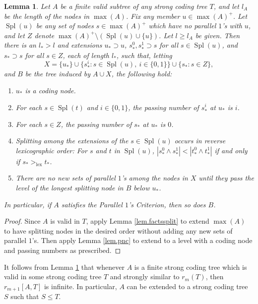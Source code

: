 \documentclass{amsart}
\newtheorem{lem}[thm]{Lemma}
\theoremstyle{remark}
\theoremstyle{definition}
\theoremstyle{remark}
\DeclareMathOperator{\Spl}{Spl}
\newcommand{\POC}{Parallel $1$'s Criterion}
\begin{document}
\begin{lem}\label{lem.facts}
Let $A$ be a finite  valid subtree of any strong coding tree  $T$, and let $l_A$ be the length of the nodes in $\max(A)$.
Fix any member $u\in\max(A)^+$.
Let $\Spl(u)$ be any set of nodes  $s\in \max(A)^+$
which  have no parallel $1$'s with $u$,
and let $Z$ denote $\max(A)^+\setminus(\Spl(u)\cup\{u\})$.
Let $l\ge l_A$ be given.
Then there is an $l_*>l$
 and extensions $u_*\supset u$,
$s_*^0,s_*^1\supset s$ for all $s\in\Spl(u)$,
and $s_*\supset s$ for all $s\in Z$, each of length $l_*$,
such that, letting
\begin{equation}
X=\{u_*\}\cup\{s_*^i:s\in\Spl(u),\ i\in\{0,1\}\}\cup\{s_*:s\in Z\},
\end{equation}
and $B$ be the tree induced by $A\cup X$,
 the following hold:
\begin{enumerate}
\item
$u_*$ is a coding node.
\item
For each $s\in\Spl(t)$ and $i\in\{0,1\}$, the passing number of $s_*^i$ at $u_*$ is $i$.
\item
For each $s\in  Z$,
the passing number of
 $s_*$ at $u_*$ is $0$.
\item
Splitting among the extensions of the $s\in \Spl(u)$ occurs in reverse lexicographic order:
For $s$ and $t$ in $\Spl(u)$,
 $|s_*^0\wedge s_*^1|<|t^0_*\wedge t^1_*|$
if and only if $s_*>_{\mathrm{lex}}t_*$.
\item
There are no new sets of  parallel $1$'s
among  the  nodes  in $X$
until they pass the level of the longest splitting node in $B$  below $u_*$.
\end{enumerate}
In particular, if $A$ satisfies the \POC, then so does $B$.
\end{lem}


\begin{proof}
Since $A$ is valid in $T$,
apply Lemma \ref{lem.factssplit}
to extend $\max(A)$ to have splitting nodes in the desired order without adding any new sets of parallel $1$'s.
Then apply Lemma
\ref{lem.pnc} to extend to a level with a coding node and passing numbers as prescribed.
\end{proof}



It follows from Lemma \ref{lem.facts}
that whenever $A$ is a finite strong coding tree
 which is valid in some  strong coding tree $T$
and strongly similar to $r_m(T)$,
then $r_{m+1}[A,T]$ is infinite.
In particular, $A$ can be extended to a strong coding tree $S$ such that $S\le T$.
\end{document}
